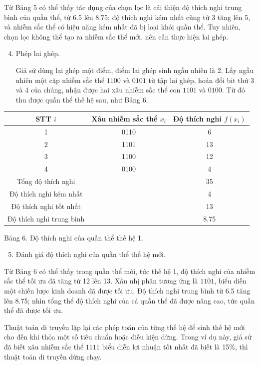 \documentclass[11pt]{article}
\begin{document}
Từ Bảng 5 có thể thấy tác dụng của chọn lọc là cải thiện độ thích nghi trung
bình của quần thể, từ 6.5 lên 8.75; độ thích nghi kém nhất cũng từ 3 tăng lên
5, và nhiễm sắc thể có hiệu năng kém nhất đã bị loại khỏi quần thể. Tuy
nhiên, chọn lọc không thể tạo ra nhiễm sắc thể mới, nên cần thực hiện lai
ghép.

\begin{enumerate}
  \setcounter{enumi}{3}
  \item Phép lai ghép.

  Giả sử dùng lai ghép một điểm, điểm lai ghép sinh ngẫu nhiên là 2. Lấy
  ngẫu nhiên một cặp nhiễm sắc thể \(1100\) và \(0101\) từ tập lai ghép, hoán
  đổi bit thứ 3 và 4 của chúng, nhận được hai xâu nhiễm sắc thể con \(1101\)
  và \(0100\). Từ đó thu được quần thể thế hệ sau, như Bảng 6.
\end{enumerate}

\begin{center}
\begin{tabular}{c|cc}
STT \(i\) & Xâu nhiễm sắc thể \(x_i\) & Độ thích nghi \(f(x_i)\)\\ \hline
1 & 0110 & 6\\
2 & 1101 & 13\\
3 & 1100 & 12\\
4 & 0100 & 4\\ \hline
Tổng độ thích nghi & & 35\\
Độ thích nghi kém nhất & & 4\\
Độ thích nghi tốt nhất & & 13\\
Độ thích nghi trung bình & & 8.75
\end{tabular}

Bảng 6. Độ thích nghi của quần thể thế hệ 1.
\end{center}

\begin{enumerate}
  \setcounter{enumi}{4}
  \item Đánh giá độ thích nghi của quần thể thế hệ mới.
\end{enumerate}

Từ Bảng 6 có thể thấy trong quần thể mới, tức thế hệ 1, độ thích nghi của
nhiễm sắc thể tối ưu đã tăng từ 12 lên 13. Xâu nhị phân tương ứng là \(1101\),
biểu diễn một chiến lược kinh doanh đã được tối ưu. Độ thích nghi trung bình
từ 6.5 tăng lên 8.75; nhìn tổng thể độ thích nghi của cả quần thể đã được
nâng cao, tức quần thể đã được tối ưu.

Thuật toán di truyền lặp lại các phép toán của từng thế hệ để sinh thế hệ
mới cho đến khi thỏa một số tiêu chuẩn hoặc điều kiện dừng. Trong ví dụ này,
giả sử đã biết xâu nhiễm sắc thể \(1111\) biểu diễn lợi nhuận tốt nhất đã
biết là 15\%, thì thuật toán di truyền dừng chạy.
\end{document}
